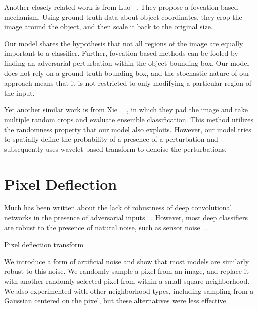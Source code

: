 Another closely related work is from Luo \etal ~\cite{FoveationbasedMALuo2015}. They propose a foveation-based mechanism.
Using ground-truth data about object coordinates, they crop the image around the object, and then scale it back to the original size.

Our model shares the hypothesis that not all regions of the image are equally important to a classifier.
Further, foveation-based methods can be fooled by finding an adversarial perturbation within the object bounding box.
Our model does not rely on a ground-truth bounding box, and the stochastic nature of our approach means that it is not restricted to only modifying a particular region of the input.

Yet another similar work is from Xie ~\etal ~\cite{MitigatingAnon208}, in which they pad the image and take multiple random crops and evaluate ensemble classification. 
This method utilizes the randomness property that our model also exploits. 
However, our model tries to spatially define the probability of a presence of a perturbation and subsequently uses wavelet-based transform to denoise the perturbations.




\section{Pixel Deflection \label{sec:pdrop}}

Much has been written about the lack of robustness of deep convolutional networks in the presence of adversarial inputs ~\cite{EasilyFNguyen2015DeepNN,IntriguingSzegedy2013}.
However, most deep classifiers are robust to the presence of natural noise, such as sensor noise ~\cite{DirtyPODiamond2017}. 
\begin{algorithm}
    \caption{Pixel deflection transform}
    \label{alg:swap}
\end{algorithm}
We introduce a form of artificial noise and show that most models are similarly robust to this noise.
We randomly sample a pixel from an image, and replace it with another randomly selected pixel from within a small square neighborhood.  We also experimented with other neighborhood types, including sampling from a Gaussian centered on the pixel, but these alternatives were less effective.
 


